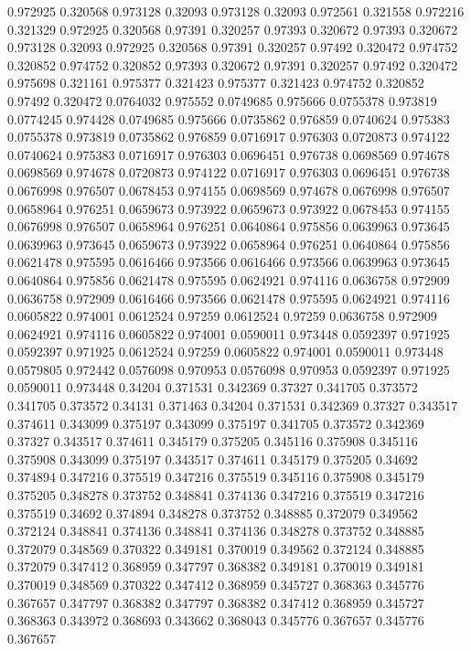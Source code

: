 0.972925 0.320568
0.973128 0.32093
0.973128 0.32093
0.972561 0.321558
0.972216 0.321329
0.972925 0.320568
0.97391 0.320257
0.97393 0.320672
0.97393 0.320672
0.973128 0.32093
0.972925 0.320568
0.97391 0.320257
0.97492 0.320472
0.974752 0.320852
0.974752 0.320852
0.97393 0.320672
0.97391 0.320257
0.97492 0.320472
0.975698 0.321161
0.975377 0.321423
0.975377 0.321423
0.974752 0.320852
0.97492 0.320472
0.0764032 0.975552
0.0749685 0.975666
0.0755378 0.973819
0.0774245 0.974428
0.0749685 0.975666
0.0735862 0.976859
0.0740624 0.975383
0.0755378 0.973819
0.0735862 0.976859
0.0716917 0.976303
0.0720873 0.974122
0.0740624 0.975383
0.0716917 0.976303
0.0696451 0.976738
0.0698569 0.974678
0.0698569 0.974678
0.0720873 0.974122
0.0716917 0.976303
0.0696451 0.976738
0.0676998 0.976507
0.0678453 0.974155
0.0698569 0.974678
0.0676998 0.976507
0.0658964 0.976251
0.0659673 0.973922
0.0659673 0.973922
0.0678453 0.974155
0.0676998 0.976507
0.0658964 0.976251
0.0640864 0.975856
0.0639963 0.973645
0.0639963 0.973645
0.0659673 0.973922
0.0658964 0.976251
0.0640864 0.975856
0.0621478 0.975595
0.0616466 0.973566
0.0616466 0.973566
0.0639963 0.973645
0.0640864 0.975856
0.0621478 0.975595
0.0624921 0.974116
0.0636758 0.972909
0.0636758 0.972909
0.0616466 0.973566
0.0621478 0.975595
0.0624921 0.974116
0.0605822 0.974001
0.0612524 0.97259
0.0612524 0.97259
0.0636758 0.972909
0.0624921 0.974116
0.0605822 0.974001
0.0590011 0.973448
0.0592397 0.971925
0.0592397 0.971925
0.0612524 0.97259
0.0605822 0.974001
0.0590011 0.973448
0.0579805 0.972442
0.0576098 0.970953
0.0576098 0.970953
0.0592397 0.971925
0.0590011 0.973448
0.34204 0.371531
0.342369 0.37327
0.341705 0.373572
0.341705 0.373572
0.34131 0.371463
0.34204 0.371531
0.342369 0.37327
0.343517 0.374611
0.343099 0.375197
0.343099 0.375197
0.341705 0.373572
0.342369 0.37327
0.343517 0.374611
0.345179 0.375205
0.345116 0.375908
0.345116 0.375908
0.343099 0.375197
0.343517 0.374611
0.345179 0.375205
0.34692 0.374894
0.347216 0.375519
0.347216 0.375519
0.345116 0.375908
0.345179 0.375205
0.348278 0.373752
0.348841 0.374136
0.347216 0.375519
0.347216 0.375519
0.34692 0.374894
0.348278 0.373752
0.348885 0.372079
0.349562 0.372124
0.348841 0.374136
0.348841 0.374136
0.348278 0.373752
0.348885 0.372079
0.348569 0.370322
0.349181 0.370019
0.349562 0.372124
0.348885 0.372079
0.347412 0.368959
0.347797 0.368382
0.349181 0.370019
0.349181 0.370019
0.348569 0.370322
0.347412 0.368959
0.345727 0.368363
0.345776 0.367657
0.347797 0.368382
0.347797 0.368382
0.347412 0.368959
0.345727 0.368363
0.343972 0.368693
0.343662 0.368043
0.345776 0.367657
0.345776 0.367657
